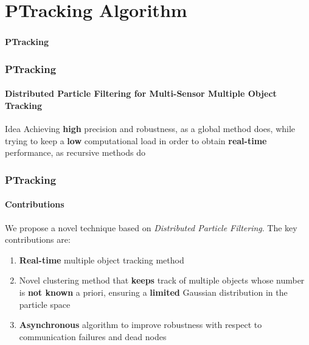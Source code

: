 \section{PTracking Algorithm}

\begin{frame}
	\frametitle{}
	
	\Huge
	
	\vspace{0.5cm}
	
	\begin{center}
		\textbf{PTracking}
	\end{center}
\end{frame}

\begin{frame}
	\frametitle{PTracking}
	\framesubtitle{Distributed Particle Filtering for Multi-Sensor Multiple Object Tracking}
	
	\LARGE
	
	\begin{block}{Idea}
		Achieving \textbf{high} precision and robustness, as a global method does, while trying to keep
		a \textbf{low} computational load in order to obtain \textbf{real-time} performance, as
		recursive methods do
	\end{block}
\end{frame}

\begin{frame}
	\frametitle{PTracking}
	\framesubtitle{Contributions}
	
	\Large
	
	\vspace{0.2cm}
	
	We propose a novel technique based on \emph{Distributed Particle Filtering}. The key contributions
	are:
	
	\vspace{0.15cm}
	
	\begin{enumerate}
		\item \textbf{Real-time} multiple object tracking method
		\item Novel clustering method that \textbf{keeps} track of multiple objects whose number is
			  \textbf{not known} a priori, ensuring a \textbf{limited} Gaussian distribution in the
			  particle space
		\item \textbf{Asynchronous} algorithm to improve robustness with respect to communication
			  failures and dead nodes
	\end{enumerate}
\end{frame}

